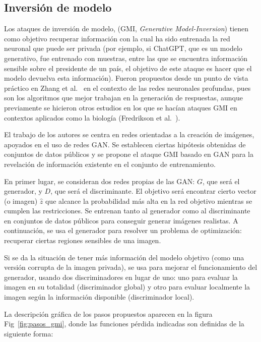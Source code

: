 \subsection*{Inversión de modelo}

Los ataques de inversión de modelo, (GMI, \textit{Generative Model-Inversion}) tienen como objetivo recuperar información con la cual ha sido entrenada la red neuronal que puede ser privada (por ejemplo, si ChatGPT, que es un modelo generativo, fue entrenado con muestras, entre las que se encuentra información sensible sobre el presidente de un país, el objetivo de este ataque es hacer que el modelo devuelva esta información). Fueron propuestos desde un punto de vista práctico en Zhang et al.~\cite{InversionModelo} en el contexto de las redes neuronales profundas, pues son los algoritmos que mejor trabajan en la generación de respuestas, aunque previamente se hicieron otros estudios en los que se hacían ataques GMI en contextos aplicados como la biología (Fredrikson et al.~\cite{ProblBiolGMI}).

El trabajo de los autores se centra en redes orientadas a la creación de imágenes, apoyados en el uso de redes GAN. Se establecen ciertas hipótesis obtenidas de conjuntos de datos públicos y se propone el ataque GMI basado en GAN para la revelación de información existente en el conjunto de entrenamiento.

En primer lugar, se consideran dos redes propias de las GAN: $G$, que será el generador, y $D$, que será el discriminante. El objetivo será encontrar cierto vector (o imagen) $\hat{z}$ que alcance la probabilidad más alta en la red objetivo mientras se cumplen las restricciones. Se entrenan tanto al generador como al discriminante en conjuntos de datos públicos para conseguir generar imágenes realistas. A continuación, se usa el generador para resolver un problema de optimización: recuperar ciertas regiones sensibles de una imagen.

Si se da la situación de tener más información del modelo objetivo (como una versión corrupta de la imagen privada), se usa para mejorar el funcionamiento del generador, usando dos discriminadores en lugar de uno: uno para evaluar la imagen en su totalidad (discriminador global) y otro para evaluar localmente la imagen según la información disponible (discriminador local).

La descripción gráfica de los pasos propuestos aparecen en la figura Fig~\ref{fig:pasos_gmi}, donde las funciones pérdida indicadas son definidas de la siguiente forma:

